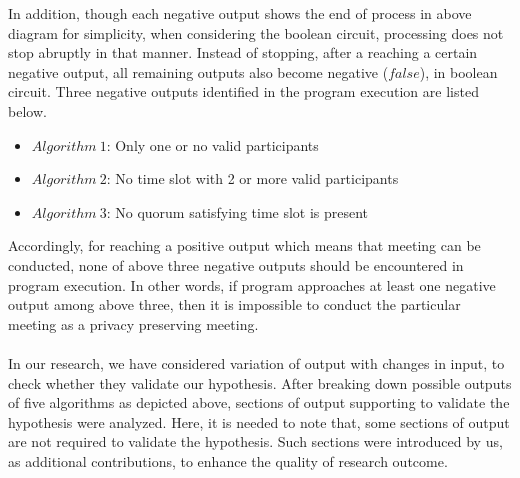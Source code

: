 In addition, though each negative output shows the end of process in above diagram for simplicity, when considering the boolean circuit, processing does not stop abruptly in that manner. Instead of stopping, after a reaching a certain negative output, all remaining outputs also become negative ($false$), in boolean circuit. Three negative outputs identified in the program execution are listed below.
\begin{itemize}
    \item $Algorithm\ 1$: Only one or no valid participants
    \item $Algorithm\ 2$: No time slot with 2 or more valid participants
    \item $Algorithm\ 3$: No quorum satisfying time slot is present
\end{itemize}
Accordingly, for reaching a positive output which means that meeting can be conducted, none of above three negative outputs should be encountered in program execution. In other words, if program approaches at least one negative output among above three, then it is impossible to conduct the particular meeting as a privacy preserving meeting.\\ \\
In our research, we have considered variation of output with changes in input, to check whether they validate our hypothesis. After breaking down possible outputs of five algorithms as depicted above, sections of output supporting to validate the hypothesis were analyzed. Here, it is needed to note that, some sections of output are not required to validate the hypothesis. Such sections were introduced by us, as additional contributions, to enhance the quality of research outcome.\\ \\

